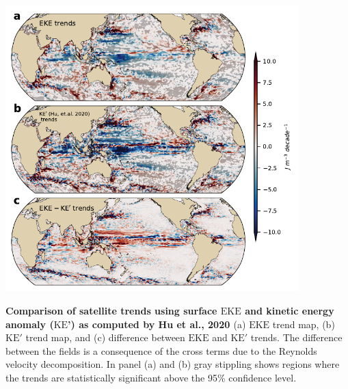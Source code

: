 \documentclass{nature}
\newcommand{\KE}{\text{KE}}
\newcommand{\EKE}{\text{EKE}}
\begin{document}
\begin{figureS}
	\centering
    \hspace{0.075\textwidth}\includegraphics[width=0.85\textwidth]{./figures/global_trend_hu_comparison.pdf}
	\caption{\textbf{Comparison of satellite trends using surface $\EKE$ and kinetic energy anomaly ($\KE$') as computed by Hu et al., 2020 \cite{Hu_acceleration_2020}} (a) $\EKE$ trend map, (b) $\KE'$ trend map, and (c) difference between $\EKE$  and $\KE'$ trends. The difference between the fields is a consequence of the cross terms due to the Reynolds velocity decomposition. In panel (a) and (b) gray stippling shows regions where the trends are statistically significant above the 95\% confidence level. \label{fig:global_trends_asper_hu}}
\end{figureS}
\end{document}
